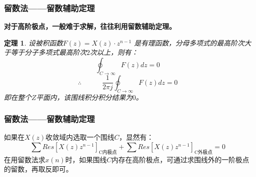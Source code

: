 \documentclass[notheorems,compress,mathserif,table]{beamer}
\newtheorem{theorem}{定理}
\begin{document}
\begin{frame}[shrink]\frametitle{留数法——留数辅助定理}%

\textbf{对于高阶极点，一般难于求解，往往利用留数辅助定理。}\par
\begin{theorem}
设被积函数$F(z)=X(z)\cdot z^{n-1}$ 是有理函数，分母多项式的最高阶次大于等于分子多项式最高阶次$2$次以上，则有：
$$\oint_{C\rightarrow \infty}F(z)dz = 0$$
$$\therefore\quad\quad\quad \frac{1}{2\pi j}\oint_{C\rightarrow \infty}F(z)dz = 0$$
即在整个$Z$平面内，该围线积分积分结果为$0$。
\end{theorem}
\end{frame}

\begin{frame}[shrink]\frametitle{留数法——留数辅助定理}%
如果在$X(z)$收敛域内选取一个围线$C$，显然有：
$$\sum Res\left[X(z)z^{n-1}\right]_{\mbox{C内极点}} +
\sum Res\left[X(z)z^{n-1}\right]_{\mbox{C外极点}} =0$$
在用留数法求$x(n)$时，如果围线$C$内存在高阶极点，可通过求围线外的一阶极点的留数，再取反即可。\par
\end{frame}
\end{document}
